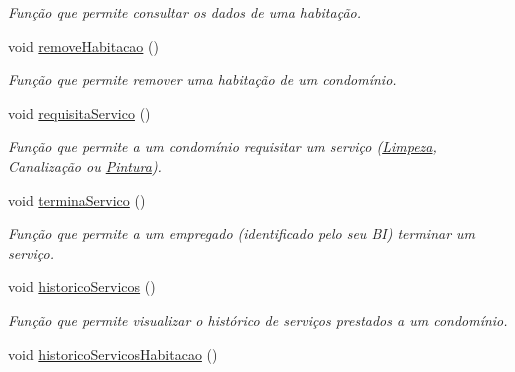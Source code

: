 \begin{DoxyCompactItemize}
\begin{DoxyCompactList}\small\item\em Função que permite consultar os dados de uma habitação. \end{DoxyCompactList}\item 
void \hyperlink{class_interface_a81422a4819d081d4b8d0af9c36e268f3}{remove\+Habitacao} ()\hypertarget{class_interface_a81422a4819d081d4b8d0af9c36e268f3}{}\label{class_interface_a81422a4819d081d4b8d0af9c36e268f3}

\begin{DoxyCompactList}\small\item\em Função que permite remover uma habitação de um condomínio. \end{DoxyCompactList}\item 
void \hyperlink{class_interface_a1cd911a367d92b2ef9a1c2b05fadf5d7}{requisita\+Servico} ()\hypertarget{class_interface_a1cd911a367d92b2ef9a1c2b05fadf5d7}{}\label{class_interface_a1cd911a367d92b2ef9a1c2b05fadf5d7}

\begin{DoxyCompactList}\small\item\em Função que permite a um condomínio requisitar um serviço (\hyperlink{class_limpeza}{Limpeza}, Canalização ou \hyperlink{class_pintura}{Pintura}). \end{DoxyCompactList}\item 
void \hyperlink{class_interface_a4a258bbbcf8d46cf0301bb8ca1792966}{termina\+Servico} ()\hypertarget{class_interface_a4a258bbbcf8d46cf0301bb8ca1792966}{}\label{class_interface_a4a258bbbcf8d46cf0301bb8ca1792966}

\begin{DoxyCompactList}\small\item\em Função que permite a um empregado (identificado pelo seu BI) terminar um serviço. \end{DoxyCompactList}\item 
void \hyperlink{class_interface_a6b95f930f246c8a802873d3f84798d8a}{historico\+Servicos} ()\hypertarget{class_interface_a6b95f930f246c8a802873d3f84798d8a}{}\label{class_interface_a6b95f930f246c8a802873d3f84798d8a}

\begin{DoxyCompactList}\small\item\em Função que permite visualizar o histórico de serviços prestados a um condomínio. \end{DoxyCompactList}\item 
void \hyperlink{class_interface_a9c249ee70e15d13ceaa4b88b7e2ad4d2}{historico\+Servicos\+Habitacao} ()\hypertarget{class_interface_a9c249ee70e15d13ceaa4b88b7e2ad4d2}{}\label{class_interface_a9c249ee70e15d13ceaa4b88b7e2ad4d2}


\end{DoxyCompactItemize}
